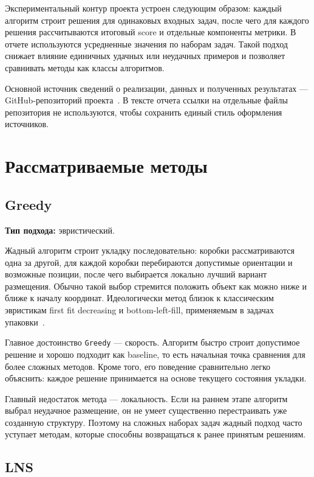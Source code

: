 \documentclass[14pt,a4paper]{extarticle}
\begin{document}
Экспериментальный контур проекта устроен следующим образом: каждый алгоритм строит решения для одинаковых входных задач, после чего для каждого решения рассчитываются итоговый score и отдельные компоненты метрики. В отчете используются усредненные значения по наборам задач. Такой подход снижает влияние единичных удачных или неудачных примеров и позволяет сравнивать методы как классы алгоритмов.

Основной источник сведений о реализации, данных и полученных результатах --- GitHub-репозиторий проекта~\cite{project_repo}. В тексте отчета ссылки на отдельные файлы репозитория не используются, чтобы сохранить единый стиль оформления источников.

\pagebreak

\section{Рассматриваемые методы}

\subsection{Greedy}

\textbf{Тип подхода:} эвристический.

Жадный алгоритм строит укладку последовательно: коробки рассматриваются одна за другой, для каждой коробки перебираются допустимые ориентации и возможные позиции, после чего выбирается локально лучший вариант размещения. Обычно такой выбор стремится положить объект как можно ниже и ближе к началу координат. Идеологически метод близок к классическим эвристикам first fit decreasing и bottom-left-fill, применяемым в задачах упаковки~\cite{wiki_bin_packing}.

Главное достоинство \texttt{Greedy} --- скорость. Алгоритм быстро строит допустимое решение и хорошо подходит как baseline, то есть начальная точка сравнения для более сложных методов. Кроме того, его поведение сравнительно легко объяснить: каждое решение принимается на основе текущего состояния укладки.

Главный недостаток метода --- локальность. Если на раннем этапе алгоритм выбрал неудачное размещение, он не умеет существенно перестраивать уже созданную структуру. Поэтому на сложных наборах задач жадный подход часто уступает методам, которые способны возвращаться к ранее принятым решениям.

\subsection{LNS}
\end{document}
